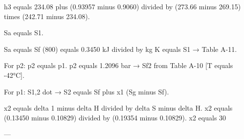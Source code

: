 h3 equals 234.08 plus (0.93957 minus 0.9060) divided by (273.66 minus 269.15) times (242.71 minus 234.08).

Sa equals S1.

Sa equals Sf (800) equals 0.3450 kJ divided by kg K equals S1 → Table A-11.

For p2: p2 equals p1.  
p2 equals 1.2096 bar → Sf2 from Table A-10 [T equals -42°C].

For p1: S1,2 dot → S2 equals Sf plus x1 (Sg minus Sf).

x2 equals delta 1 minus delta H divided by delta S minus delta H.  
x2 equals (0.13450 minus 0.10829) divided by (0.19354 minus 0.10829).  
x2 equals 30%

---